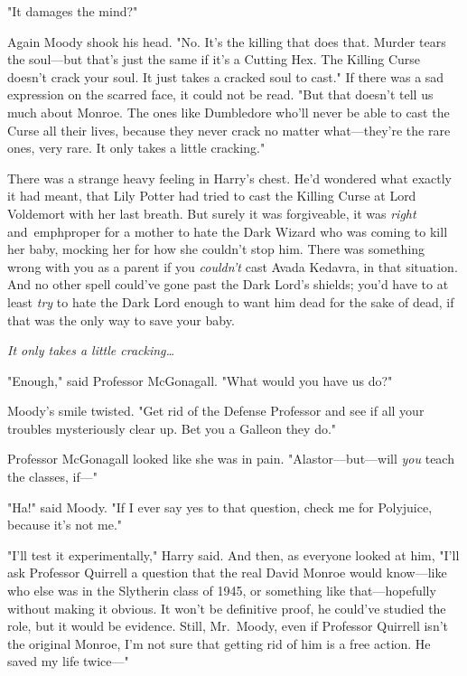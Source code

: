 "It damages the mind?"

Again Moody shook his head. "No. It's the killing that does that. Murder tears 
the soul---but that's just the same if it's a Cutting Hex. The Killing Curse 
doesn't crack your soul. It just takes a cracked soul to cast." If there was a 
sad expression on the scarred face, it could not be read. "But that doesn't 
tell us much about Monroe. The ones like Dumbledore who'll never be able to 
cast the Curse all their lives, because they never crack no matter 
what---they're the rare ones, very rare. It only takes a little cracking."

There was a strange heavy feeling in Harry's chest. He'd wondered what exactly 
it had meant, that Lily Potter had tried to cast the Killing Curse at Lord 
Voldemort with her last breath. But surely it was forgiveable, it was 
\emph{right} and\ emph{proper} for a mother to hate the Dark Wizard who was 
coming to kill her baby, mocking her for how she couldn't stop him. There was 
something wrong with you as a parent if you \emph{couldn't} cast Avada Kedavra, 
in that situation. And no other spell could've gone past the Dark Lord's 
shields; you'd have to at least \emph{try} to hate the Dark Lord enough to want 
him dead for the sake of dead, if that was the only way to save your baby.

\emph{It only takes a little cracking{\ldots}}

"Enough," said Professor McGonagall. "What would you have us do?"

Moody's smile twisted. "Get rid of the Defense Professor and see if all your 
troubles mysteriously clear up. Bet you a Galleon they do."

Professor McGonagall looked like she was in pain. "Alastor---but---will 
\emph{you} teach the classes, if---"

"Ha!" said Moody. "If I ever say yes to that question, check me for Polyjuice, 
because it's not me."

"I'll test it experimentally," Harry said. And then, as everyone looked at him, 
"I'll ask Professor Quirrell a question that the real David Monroe would 
know---like who else was in the Slytherin class of 1945, or something like 
that---hopefully without making it obvious. It won't be definitive proof, he 
could've studied the role, but it would be evidence. Still, Mr.~Moody, even if 
Professor Quirrell isn't the original Monroe, I'm not sure that getting rid of 
him is a free action. He saved my life twice---"

